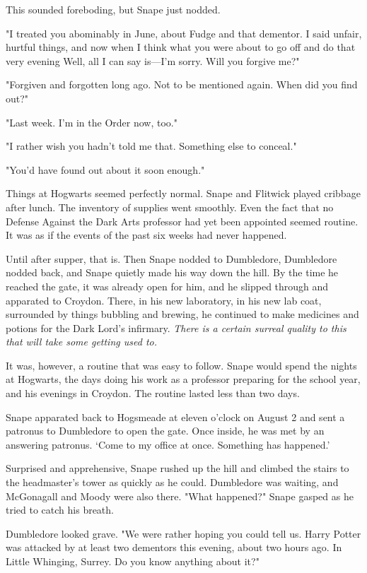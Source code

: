 This sounded foreboding, but Snape just nodded.

"I treated you abominably in June, about Fudge and that dementor. I said unfair, hurtful things, and now when I think what you were about to go off and do that very evening{\el} Well, all I can say is—I'm sorry. Will you forgive me?"

"Forgiven and forgotten long ago. Not to be mentioned again. When did you find out?"

"Last week. I'm in the Order now, too."

"I rather wish you hadn't told me that. Something else to conceal."

"You'd have found out about it soon enough."

Things at Hogwarts seemed perfectly normal. Snape and Flitwick played cribbage after lunch. The inventory of supplies went smoothly. Even the fact that no Defense Against the Dark Arts professor had yet been appointed seemed routine. It was as if the events of the past six weeks had never happened.

Until after supper, that is. Then Snape nodded to Dumbledore, Dumbledore nodded back, and Snape quietly made his way down the hill. By the time he reached the gate, it was already open for him, and he slipped through and apparated to Croydon. There, in his new laboratory, in his new lab coat, surrounded by things bubbling and brewing, he continued to make medicines and potions for the Dark Lord's infirmary. \emph{There is a certain surreal quality to this that will take some getting used to.}

It was, however, a routine that was easy to follow. Snape would spend the nights at Hogwarts, the days doing his work as a professor preparing for the school year, and his evenings in Croydon. The routine lasted less than two days.

Snape apparated back to Hogsmeade at eleven o'clock on August 2 and sent a patronus to Dumbledore to open the gate. Once inside, he was met by an answering patronus. `Come to my office at once. Something has happened.'

Surprised and apprehensive, Snape rushed up the hill and climbed the stairs to the headmaster's tower as quickly as he could. Dumbledore was waiting, and McGonagall and Moody were also there. "What happened?" Snape gasped as he tried to catch his breath.

Dumbledore looked grave. "We were rather hoping you could tell us. Harry Potter was attacked by at least two dementors this evening, about two hours ago. In Little Whinging, Surrey. Do you know anything about it?"

